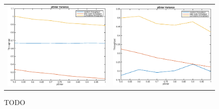 \begin{figure}
\begin{center}
\begin{tabular}{cc}

\includegraphics[scale=0.35]{../../src/fig-simulation_random_web-penter-1_0_1_0_1_1_5.eps} & \includegraphics[scale=0.35]{../../src/fig-simulation_random_web-penter-1_0_5_0_1_1_5.eps} \\
\end{tabular}
\caption{TODO}
\label{fig:randomstuff2}
\end{center}
\end{figure}
